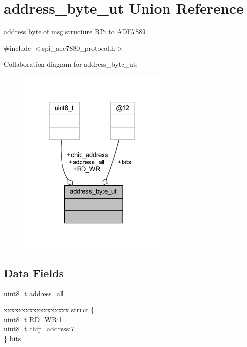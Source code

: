 \hypertarget{a00011}{\section{address\-\_\-byte\-\_\-ut Union Reference}
\label{da/d45/a00011}
}


address byte of msg structure R\-Pi to A\-D\-E7880  




{\ttfamily \#include $<$spi\-\_\-ade7880\-\_\-protocol.\-h$>$}



Collaboration diagram for address\-\_\-byte\-\_\-ut\-:\nopagebreak
\begin{figure}[H]
\begin{center}
\leavevmode
\includegraphics[width=211pt]{d3/d8b/a00059}
\end{center}
\end{figure}
\subsection*{Data Fields}
\begin{DoxyCompactItemize}
\item 
uint8\-\_\-t \hyperlink{a00011_a7bf6defa0ae3fb2bca057a3a97d4f740}{address\-\_\-all}
\item 
\begin{tabbing}
xx\=xx\=xx\=xx\=xx\=xx\=xx\=xx\=xx\=\kill
struct \{\\
\>uint8\_t \hyperlink{a00011_a97e2668c8e5470fa66185f16dc2e8045}{RD\_WR}:1\\
\>uint8\_t \hyperlink{a00011_a935ee6f74a5c245878a724b16c4b06b7}{chip\_address}:7\\
\} \hyperlink{a00011_ae121725fb28cc26495969d71e0e0d42e}{bits}\\

\end{tabbing}\end{DoxyCompactItemize}


